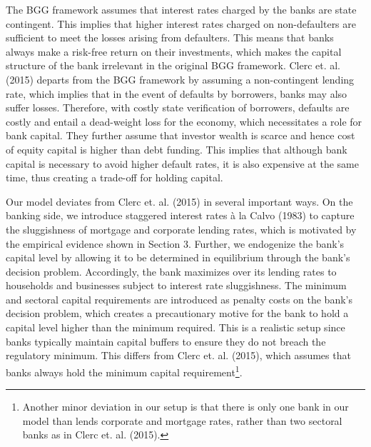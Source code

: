 \documentclass[12pt]{article}
\numberwithin{equation}{section}
\begin{document}
The BGG framework assumes that interest rates charged by the banks are state contingent. This implies that higher interest rates charged on non-defaulters are sufficient to meet the losses arising from defaulters. This means that banks always make a risk-free return on their investments, which makes the capital structure of the bank irrelevant in the original BGG framework. Clerc et. al. (2015) departs from the BGG framework by assuming a non-contingent lending rate, which implies that in the event of defaults by borrowers, banks may also suffer losses. Therefore, with costly state verification of borrowers, defaults are costly and entail a dead-weight loss for the economy, which necessitates a role for bank capital. They further assume that investor wealth is scarce and hence cost of equity capital is higher than debt funding. This implies that although bank capital is necessary to avoid higher default rates, it is also expensive at the same time, thus creating a trade-off for holding capital. 

Our model deviates from Clerc et. al. (2015) in several important ways. On the banking side, we introduce staggered interest rates à la Calvo (1983) to capture the sluggishness of mortgage and corporate lending rates, which is motivated by the empirical evidence shown in Section 3. Further, we endogenize the bank's capital level by allowing it to be determined in equilibrium through the bank's decision problem. Accordingly, the bank maximizes over its lending rates to households and businesses subject to interest rate sluggishness. The minimum and sectoral capital requirements are introduced as penalty costs on the bank's decision problem, which creates a precautionary motive for the bank to hold a capital level higher than the minimum required. This is a realistic setup since banks typically maintain capital buffers to ensure they do not breach the regulatory minimum. This differs from Clerc et. al. (2015), which assumes that banks always hold the minimum capital requirement\footnote{Another minor deviation in our setup is that there is only one bank in our model than lends corporate and mortgage rates, rather than two sectoral banks as in Clerc et. al. (2015).}. 
\end{document}
